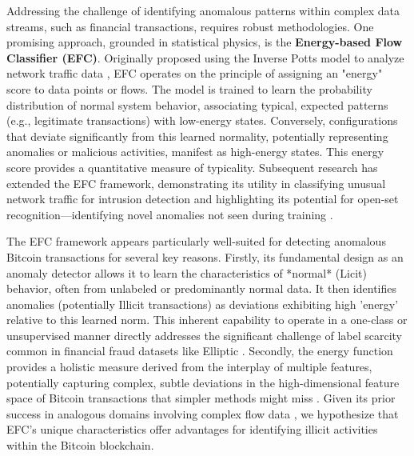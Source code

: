 \documentclass[12pt]{article}
\begin{document}
Addressing the challenge of identifying anomalous patterns within complex data streams, such as financial transactions,
requires robust methodologies. One promising approach, grounded in statistical physics, is the \textbf{Energy-based Flow Classifier (EFC)}.
Originally proposed using the Inverse Potts model to analyze network traffic data \cite{pontes2019}, EFC operates on the
principle of assigning an "energy" score to data points or flows. The model is trained to learn the probability distribution
of normal system behavior, associating typical, expected patterns (e.g., legitimate transactions) with low-energy states.
Conversely, configurations that deviate significantly from this learned normality, potentially representing anomalies or
malicious activities, manifest as high-energy states. This energy score provides a quantitative measure of typicality.
Subsequent research has extended the EFC framework, demonstrating its utility in classifying unusual network traffic for
intrusion detection and highlighting its potential for open-set recognition—identifying novel anomalies not seen during
training \cite{pontes2019, souza2022novelopensetenergybased}.

The EFC framework appears particularly well-suited for detecting anomalous Bitcoin transactions for several key reasons.
Firstly, its fundamental design as an anomaly detector allows it to learn the characteristics of *normal* (Licit) behavior,
often from unlabeled or predominantly normal data. It then identifies anomalies (potentially Illicit transactions) as
deviations exhibiting high 'energy' relative to this learned norm. This inherent capability to operate in a one-class or
unsupervised manner directly addresses the significant challenge of label scarcity common in financial fraud datasets like
Elliptic \cite{bansal2022systematic}. Secondly, the energy function provides a holistic measure derived from
the interplay of multiple features, potentially capturing complex, subtle deviations in the high-dimensional feature space
of Bitcoin transactions that simpler methods might miss \cite{wilson2024future}. Given its prior success in
analogous domains involving complex flow data \cite{pontes2019, souza2022novelopensetenergybased}, we hypothesize that
EFC's unique characteristics offer advantages for identifying illicit activities within the Bitcoin blockchain.
\end{document}
